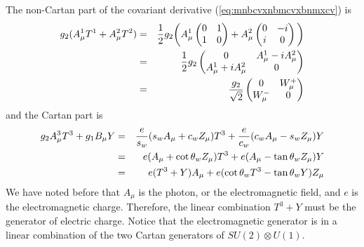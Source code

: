 \documentclass[12pt,epsf]{article}
\def\nolabel{\nonumber }
\def\nolabel{\nonumber }
\begin{document}
The non-Cartan part of the covariant derivative
(\ref{eq:mnbcvxnbmcvxbnmxcv}) is
\begin{eqnarray}
g_2(A^1_{\mu}T^1 + A^2_{\mu}T^2) &=& {1\over 2}g_2\bigg(A^1_{\mu}
\begin{pmatrix}
0 & 1 \\ 1 & 0
\end{pmatrix} + A^2_{\mu}
\begin{pmatrix}
0 & -i \\ i & 0
\end{pmatrix}\bigg) \nolabel \\
&=& {1\over 2} g_2
\begin{pmatrix}
0 & A^1_{\mu} - iA^2_{\mu} \\ 
A^1_{\mu} + i A^2_{\mu} & 0
\end{pmatrix} \nolabel \\
&=& {g_2\over \sqrt{2}}
\begin{pmatrix}
0 & W^+_{\mu} \\ 
W^-_{\mu} & 0
\end{pmatrix}\nolabel
\end{eqnarray}
and the Cartan part is
\begin{eqnarray}
g_2A^3_{\mu}T^3 + g_1B_{\mu}Y &=& {e \over s_w}(s_wA_{\mu} +
c_wZ_{\mu})T^3 + {e \over c_w}(c_wA_{\mu}-s_wZ_{\mu})Y \nolabel \\
&=& e(A_{\mu}+\cot\theta_wZ_{\mu})T^3+e(A_{\mu}-\tan\theta_wZ_{\mu})Y
\nolabel \\
&=& e(T^3+Y)A_{\mu}+e(\cot\theta_wT^3-\tan\theta_wY)Z_{\mu} \nolabel
\end{eqnarray}
We have noted before that $A_{\mu}$ is the photon, or the
electromagnetic field, and $e$ is the electromagnetic charge. 
Therefore, the linear combination $T^3+Y$ must be the generator of
electric charge.  Notice that the electromagnetic generator is in a
linear combination of the two Cartan generators of $SU(2)\otimes U(1)$. 
\end{document}
